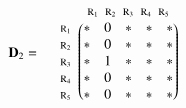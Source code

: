 \documentclass[a4paper,10pt]{article}
\begin{document}
\bigskip

\begin{equation*}
\mathbf{D}_2 = \; \; \; \; \; \begin{matrix}
 & 

\begin{matrix}
\text{\scriptsize $\mathrm{R}_1$} \!\!\! & 
\text{\scriptsize $\mathrm{R}_2$} \!\!\! & 
\text{\scriptsize $\mathrm{R}_3$} \!\!\! & 
\text{\scriptsize $\mathrm{R}_4$} \!\!\! & 
\text{\scriptsize $\mathrm{R}_5$}
\end{matrix}

\\ 

\begin{matrix*}[l]
\text{\scriptsize $\mathrm{R}_1$} \!\!\! \\
\text{\scriptsize $\mathrm{R}_2$} \!\!\! \\
\text{\scriptsize $\mathrm{R}_3$} \!\!\! \\
\text{\scriptsize $\mathrm{R}_4$} \!\!\! \\
\text{\scriptsize $\mathrm{R}_5$} \!\!\!
\end{matrix*}

& 

\begin{pmatrix}
* & 0 & * & * & * \\
* & 0 & * & * & * \\
* & 1 & * & * & * \\
* & 0 & * & * & * \\
* & 0 & * & * & *
\end{pmatrix}

\end{matrix}
\end{equation*}

\bigskip
\end{document}
